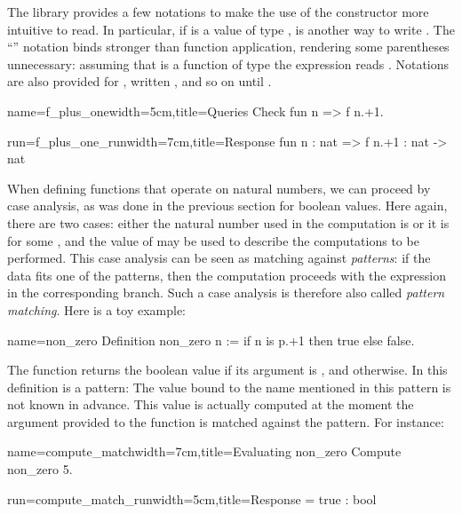 The \mcbMC{} library provides a few notations to make the use of the
constructor  more intuitive to read.  In particular, if 
is a value of type ,  is another way to write
.  The ``'' notation binds stronger than function
application, rendering some parentheses unnecessary:
assuming  that  is a function of type
 the expression  reads
.  Notations are also provided for , written
, and so on until .

\begin{coq-left}{name=f_plus_one}{width=5cm,title=Queries}
Check fun n => f n.+1.
\end{coq-left}
\begin{coqout-right}{run=f_plus_one_run}{width=7cm,title=Response}
fun n : nat => f n.+1 : nat -> nat
\end{coqout-right}

When defining functions that operate on natural numbers, we
can
proceed by case analysis, as was done in the previous section for boolean
values. Here again, there are two cases: either the natural number used in
the computation is  or it is  for
some , and the value of  may be used to describe the
computations to be performed. This case analysis can be seen as
matching against \emph{patterns}: if the data fits one of
the patterns, then the computation proceeds with the expression in the
corresponding branch.  Such a case analysis is therefore also called
\emph{pattern matching}. Here is a toy example:

\begin{coq}{name=non_zero}{}
Definition non_zero n := if n is p.+1 then true else false.
\end{coq}
%

The function  returns the boolean value  if its
argument is , and  otherwise. In this definition  is a
pattern: The value bound to the name  mentioned in this pattern is not
known in advance. This value is actually computed at the moment the
argument  provided to the function is matched against the
pattern. For instance:

\begin{coq-left}{name=compute_match}{width=7cm,title=Evaluating non_zero}
Compute non_zero 5.
\end{coq-left}
\begin{coqout-right}{run=compute_match_run}{width=5cm,title=Response}
= true : bool
\end{coqout-right}


